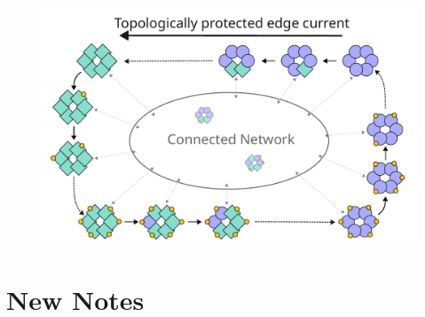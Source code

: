 \documentclass[11pt]{article}
\begin{document}
\begin{figure}[H]
	\centering
	\includegraphics[width=\textwidth]{diagram/diagram_circly.pdf}
\end{figure}

\newpage
\printbibliography

%
\newpage
\section{New Notes}
\end{document}
